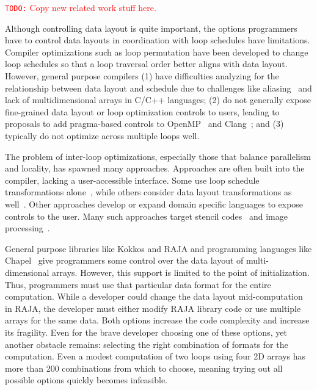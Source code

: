 \documentclass{article}
\newcommand{\todo}[1]{{\textcolor{red}{{\tt{TODO:}}\,\,#1 }}}
\begin{document}
\todo{Copy new related work stuff here.}

Although controlling data layout is quite important, the options programmers have to control data layouts in coordination with loop schedules have limitations.
Compiler optimizations such as loop permutation have been developed to change loop schedules so that a loop traversal order better aligns with data layout.
However, general purpose compilers 
(1) have difficulties analyzing for the relationship between
data layout and schedule due to challenges like aliasing~\cite{hind2001pointer} and lack of multidimensional arrays in 
C/C++ languages; 
(2) do not generally expose fine-grained data layout or loop optimization
controls to users, leading to proposals to add pragma-based controls to OpenMP~\cite{kruse2019design} and Clang~\cite{kruse2018user}; and 
(3) typically do not optimize across multiple loops well.

The problem of inter-loop optimizations, especially those that balance parallelism and locality, has spawned many approaches. 
Approaches are often built into the compiler, lacking a user-accessible interface.
Some use loop schedule transformations alone~\cite{wolf1991data,mckinley1996improving}, while others consider data layout transformations as well~\cite{cierniak1995unifying,kennedy1995automatic,kandemir1998improving,  chen2005constraint, chen2005integrating, ozturk2011data}.
Other approaches develop or expand domain specific languages to expose controls to the user.
Many such approaches target stencil codes~\cite{henretty2011data,kronawitter2018automatic,luporini2018design} and image processing~\cite{ragan-kelley2013halide,mullapudi2015polymage}.

General purpose libraries like Kokkos and RAJA and programming languages like Chapel~\cite{diaconescu2007approach} give programmers some control over the data layout of multi-dimensional arrays. However, this support is limited to the point of initialization.
Thus, programmers must use that particular data format for the entire computation.
While a developer could change the data layout mid-computation in RAJA, the developer must either modify RAJA library code or use multiple arrays for the same data. 
Both options increase the code complexity and increase its fragility.
Even for the brave developer choosing one of these options, yet another obstacle remains: selecting the right combination of formats for the computation.
Even a modest computation of two loops using four 2D arrays has more than 200 combinations from which to choose, meaning trying out all possible options quickly becomes infeasible. 
\end{document}

